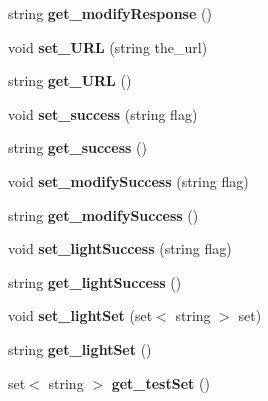 \begin{DoxyCompactItemize}
string {\bfseries get\+\_\+modify\+Response} ()
\item 
\mbox{\label{class_bridge_ac127889bab11771234bca1f979a7a256}} 
void {\bfseries set\+\_\+\+U\+RL} (string the\+\_\+url)
\item 
\mbox{\label{class_bridge_af75ec43258bbe6f7b0a75843c2330537}} 
string {\bfseries get\+\_\+\+U\+RL} ()
\item 
\mbox{\label{class_bridge_a43c11c79e297eca19b1791a9c190b110}} 
void {\bfseries set\+\_\+success} (string flag)
\item 
\mbox{\label{class_bridge_a11d8ba5fedcc58a368f912dd604e6841}} 
string {\bfseries get\+\_\+success} ()
\item 
\mbox{\label{class_bridge_a8d5ccebeec122a6113c034f647ddfff4}} 
void {\bfseries set\+\_\+modify\+Success} (string flag)
\item 
\mbox{\label{class_bridge_ac55f7ccf6a539f3e1b6a1ba5365b6caa}} 
string {\bfseries get\+\_\+modify\+Success} ()
\item 
\mbox{\label{class_bridge_a2fc01183bf0199ea09c10a14fa408f31}} 
void {\bfseries set\+\_\+light\+Success} (string flag)
\item 
\mbox{\label{class_bridge_a689b8f5bbebac2d078bb675f386bbe1b}} 
string {\bfseries get\+\_\+light\+Success} ()
\item 
\mbox{\label{class_bridge_ad5067ef5a7cc8f6649b7b3ad700605a5}} 
void {\bfseries set\+\_\+light\+Set} (set$<$ string $>$ set)
\item 
\mbox{\label{class_bridge_a9442a175edbb6098a7595e4eb00dce86}} 
string {\bfseries get\+\_\+light\+Set} ()
\item 
\mbox{\label{class_bridge_a7c1963452e0e7065649b88c5a1f003b9}} 
set$<$ string $>$ {\bfseries get\+\_\+test\+Set} ()
\item 
\mbox{\label{class_bridge_ad1913b3d194f2aa25fe79a4d8b278246}} 

\end{DoxyCompactItemize}
